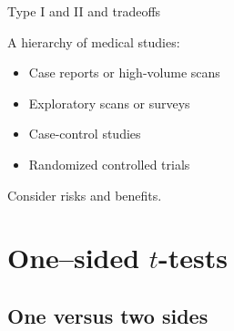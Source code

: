 \begin{frame}{Type I and II and tradeoffs}

    A hierarchy of medical studies:
    \begin{itemize}
        \item Case reports or high-volume scans
        \item Exploratory scans or surveys
        \item Case-control studies
        \item Randomized controlled trials
    \end{itemize}


    \vspace{2em}

    Consider risks and benefits.


\end{frame}



\section{One--sided $t$-tests}

\subsection{One versus two sides}


